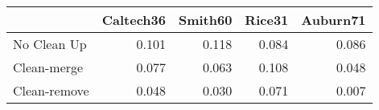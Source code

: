 \begin{tabular}{lrrrr}
\toprule
{} & Caltech36 & Smith60 & Rice31 & Auburn71 \\
\midrule
No Clean Up  &     0.101 &   0.118 &  0.084 &    0.086 \\
Clean-merge  &     0.077 &   0.063 &  0.108 &    0.048 \\
Clean-remove &     0.048 &   0.030 &  0.071 &    0.007 \\
\bottomrule
\end{tabular}
